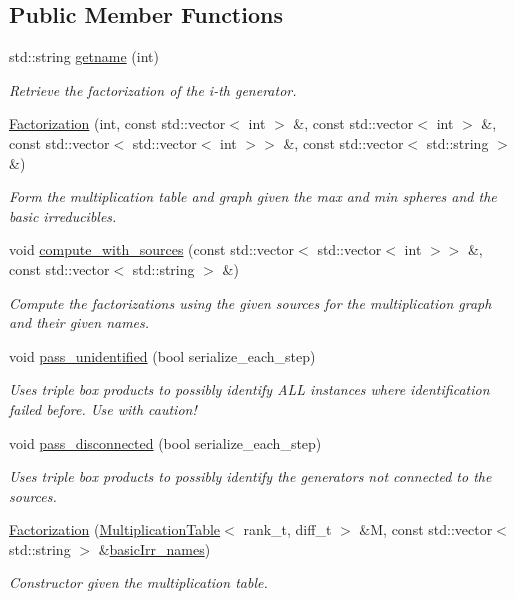 \subsection*{Public Member Functions}
\begin{DoxyCompactItemize}
\item 
std\+::string \hyperlink{classMackey_1_1Factorization_ac5088227511baaaec1f62802b75d3a9e}{getname} (int)
\begin{DoxyCompactList}\small\item\em Retrieve the factorization of the i-\/th generator. \end{DoxyCompactList}\item 
\hyperlink{classMackey_1_1Factorization_af1b07ab5021c4e51698c4cd3fbb85422}{Factorization} (int, const std\+::vector$<$ int $>$ \&, const std\+::vector$<$ int $>$ \&, const std\+::vector$<$ std\+::vector$<$ int $>$$>$ \&, const std\+::vector$<$ std\+::string $>$ \&)
\begin{DoxyCompactList}\small\item\em Form the multiplication table and graph given the max and min spheres and the basic irreducibles. \end{DoxyCompactList}\item 
void \hyperlink{classMackey_1_1Factorization_a2e135a37687fc3d69cd16a8729dd19eb}{compute\+\_\+with\+\_\+sources} (const std\+::vector$<$ std\+::vector$<$ int $>$$>$ \&, const std\+::vector$<$ std\+::string $>$ \&)
\begin{DoxyCompactList}\small\item\em Compute the factorizations using the given sources for the multiplication graph and their given names. \end{DoxyCompactList}\item 
void \hyperlink{classMackey_1_1Factorization_a0f1115a0af9f4fb294646aee85ebb2e4}{pass\+\_\+unidentified} (bool serialize\+\_\+each\+\_\+step)
\begin{DoxyCompactList}\small\item\em Uses triple box products to possibly identify A\+LL instances where identification failed before. Use with caution! \end{DoxyCompactList}\item 
void \hyperlink{classMackey_1_1Factorization_aad2d840b523d193f4c3554e9e3f7fb00}{pass\+\_\+disconnected} (bool serialize\+\_\+each\+\_\+step)
\begin{DoxyCompactList}\small\item\em Uses triple box products to possibly identify the generators not connected to the sources. \end{DoxyCompactList}\item 
\hyperlink{classMackey_1_1Factorization_a4d55bc1d6f94bdbcd365ed1bb0eaa2cb}{Factorization} (\hyperlink{classMackey_1_1MultiplicationTable}{Multiplication\+Table}$<$ rank\+\_\+t, diff\+\_\+t $>$ \&M, const std\+::vector$<$ std\+::string $>$ \&\hyperlink{classMackey_1_1Factorization_aafee5aadae0d83b75741e0e8c2955625}{basic\+Irr\+\_\+names})
\begin{DoxyCompactList}\small\item\em Constructor given the multiplication table. \end{DoxyCompactList}\end{DoxyCompactItemize}
